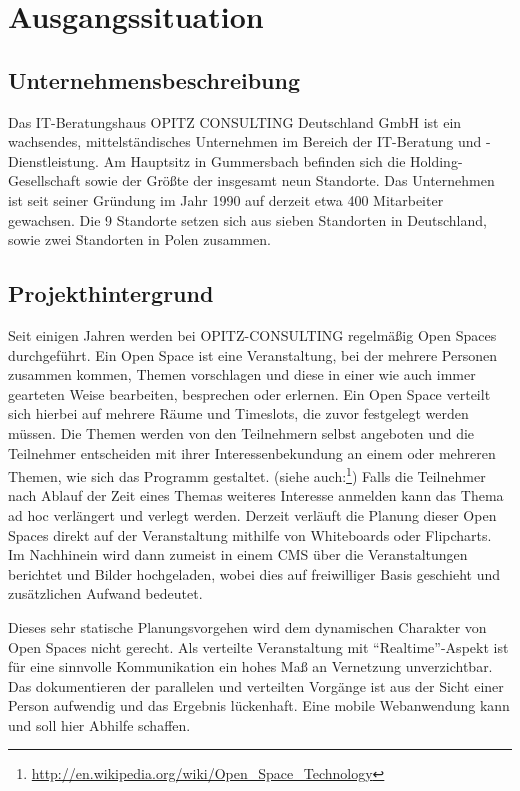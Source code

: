 \section{Ausgangssituation}
\subsection{Unternehmensbeschreibung}
Das IT-Beratungshaus OPITZ CONSULTING Deutschland GmbH ist ein
wachsendes, mittelständisches Unternehmen im Bereich der IT-Beratung
und -Dienstleistung. Am Hauptsitz in Gummersbach befinden sich die
Holding-Gesellschaft sowie der Größte der insgesamt neun Standorte.
Das Unternehmen ist seit seiner Gründung im Jahr 1990 auf derzeit etwa
400 Mitarbeiter gewachsen. Die 9 Standorte setzen sich aus sieben
Standorten in Deutschland, sowie zwei Standorten in Polen zusammen.
\subsection{Projekthintergrund}
Seit einigen Jahren werden bei OPITZ-CONSULTING regelmäßig Open Spaces
durchgeführt. Ein Open Space ist eine Veranstaltung, bei der mehrere
Personen zusammen kommen, Themen vorschlagen und diese in einer wie
auch immer gearteten Weise bearbeiten, besprechen oder erlernen. Ein
Open Space verteilt sich hierbei auf mehrere Räume und Timeslots, die
zuvor festgelegt werden müssen. Die Themen werden von den Teilnehmern
selbst angeboten und die Teilnehmer entscheiden mit ihrer
Interessenbekundung an einem oder mehreren Themen, wie sich das
Programm gestaltet. (siehe auch:\footnote{\url{http://en.wikipedia.org/wiki/Open_Space_Technology}})
Falls die Teilnehmer nach Ablauf der Zeit eines Themas weiteres
Interesse anmelden kann das Thema ad hoc verlängert und verlegt
werden.
\noindent Derzeit verläuft die Planung dieser Open Spaces direkt auf
der Veranstaltung mithilfe von Whiteboards oder Flipcharts. Im
Nachhinein wird dann zumeist in einem \gls{CMS} über die Veranstaltungen
berichtet und Bilder hochgeladen, wobei dies auf freiwilliger Basis
geschieht und zusätzlichen Aufwand bedeutet.

\noindent Dieses sehr statische Planungsvorgehen wird dem dynamischen
Charakter von Open Spaces nicht gerecht. Als verteilte Veranstaltung
mit ``Realtime''-Aspekt ist für eine sinnvolle Kommunikation ein hohes
Maß an Vernetzung unverzichtbar. Das dokumentieren der parallelen und
verteilten Vorgänge ist aus der Sicht einer Person aufwendig und das
Ergebnis lückenhaft. Eine mobile Webanwendung kann und soll hier
Abhilfe schaffen.

